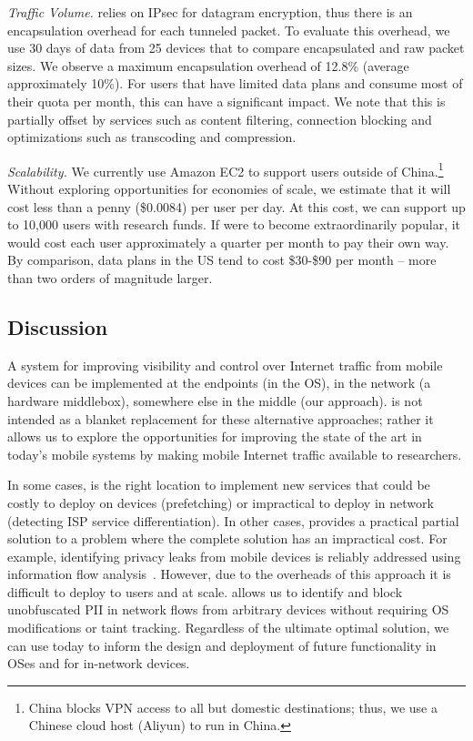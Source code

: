 \noindent\emph{Traffic Volume.}
\meddle relies on IPsec for datagram encryption, thus there is an encapsulation overhead for each tunneled packet. 
To evaluate this overhead, we use 30 days of data from 25 devices that to compare encapsulated and raw packet sizes. 
We observe a maximum encapsulation overhead of 12.8\% (average approximately 10\%). 
For users that have limited data plans and consume most of their quota per month, this can have 
a significant impact. We note that this is partially offset by \meddle services such as content filtering, 
connection blocking and optimizations such as transcoding and compression. 

\noindent\emph{Scalability.} We currently use Amazon EC2 to support users outside of China.\footnote{China 
blocks VPN access to all but domestic destinations; thus, we use a Chinese cloud host (Aliyun) to run  
\meddle in China.} Without exploring opportunities for economies of scale, we estimate that 
it will cost less than a penny (\$0.0084) per user per day. At this cost, we can support up to 
10,000 users with research funds. If \meddle were to become extraordinarily popular, it would 
cost each user approximately a quarter per month to pay their own way. By comparison, 
data plans in the US tend to cost \$30-\$90 per month -- more than two orders of magnitude larger.


\subsection{Discussion}

 A system for improving visibility and control over Internet traffic from mobile 
devices can be implemented at the endpoints (\eg in the OS), in the network (\eg a hardware middlebox), 
somewhere else in the middle (our approach). \meddle is not intended as a blanket replacement for 
these alternative approaches; rather it allows us to explore the opportunities for improving the state of the 
art in today's mobile systems by making mobile Internet traffic available to researchers. 

In some cases, \meddle is the right location to implement new services that could be costly 
to deploy on devices (prefetching) or impractical to deploy in network (detecting ISP service differentiation). 
In other cases, \meddle provides a practical partial solution to a problem where the complete solution has an impractical 
cost. For example, identifying privacy leaks from mobile devices is reliably addressed using information flow 
analysis~\cite{enck:taintdroid}. However, due to the overheads of this approach it is difficult to deploy to users 
and at scale. \meddle allows us to identify and block unobfuscated PII in network flows from arbitrary devices without requiring 
OS modifications or taint tracking. Regardless of the ultimate optimal solution, we can use \meddle today to inform the design 
and deployment of future functionality in OSes and for in-network devices. 

